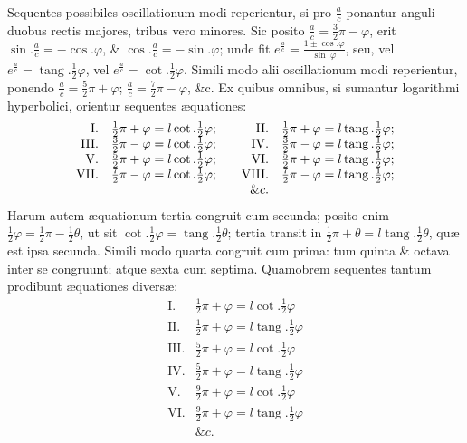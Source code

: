 Sequentes possibiles oscillationum modi reperientur, si pro $\frac ac$ ponantur anguli duobus rectis majores, tribus vero minores. Sic posito $\frac ac=\frac32\pi-\varphi$, erit $\sin.\frac ac=-\cos.\varphi$, \& $\cos.\frac ac=-\sin.\varphi$; unde fit $e^{\frac ac}=\frac{1\pm\cos.\varphi}{\sin.\varphi}$, seu, vel $e^{\frac ac}=\operatorname{tang}.\frac12\varphi$, vel $e^{\frac ac}=\cot.\frac12\varphi$. Simili modo alii oscillationum modi reperientur, ponendo $\frac ac=\frac52\pi+\varphi$; $\frac ac=\frac72\pi-\varphi$, \&c. Ex quibus omnibus, si sumantur logarithmi hyperbolici, orientur sequentes æquationes:
\[\begin{array}{rl@{\qquad}rl}
\mathrm{I}.&\frac12\pi+\varphi=l\cot.\frac12\varphi;&\mathrm{II}.&\frac12\pi+\varphi=l\operatorname{tang}.\frac12\varphi;\\
\mathrm{III}.&\frac32\pi-\varphi=l\cot.\frac12\varphi;&\mathrm{IV}.&\frac32\pi-\varphi=l\operatorname{tang}.\frac12\varphi;\\
\mathrm{V}.&\frac52\pi+\varphi=l\cot.\frac12\varphi;&\mathrm{VI}.&\frac52\pi+\varphi=l\operatorname{tang}.\frac12\varphi;\\
\mathrm{VII}.&\frac72\pi-\varphi=l\cot.\frac12\varphi;&\mathrm{VIII}.&\frac72\pi-\varphi=l\operatorname{tang}.\frac12\varphi;\\
&&\&c.
\end{array}\]
Harum autem æquationum tertia congruit cum secunda; posito enim $\frac12\varphi=\frac12\pi-\frac12\theta$, ut sit $\cot.\frac12\varphi=\operatorname{tang}.\frac12\theta$; tertia transit in $\frac12\pi+\theta=l\operatorname{tang}.\frac12\theta$, quæ est ipsa secunda. Simili modo quarta congruit cum prima: tum quinta \& octava inter se
congruunt; atque sexta cum septima. Quamobrem sequentes tantum prodibunt æquationes diversæ:
\[\begin{array}{rl}
\mathrm{I}.&\frac12\pi+\varphi=l\cot.\frac12\varphi\\
\mathrm{II}.&\frac12\pi+\varphi=l\operatorname{tang}.\frac12\varphi\\
\mathrm{III}.&\frac52\pi+\varphi=l\cot.\frac12\varphi\\
\mathrm{IV}.&\frac52\pi+\varphi=l\operatorname{tang}.\frac12\varphi\\
\mathrm{V}.&\frac92\pi+\varphi=l\cot.\frac12\varphi\\
\mathrm{VI}.&\frac92\pi+\varphi=l\operatorname{tang}.\frac12\varphi\\
&\&c.
\end{array}\]

